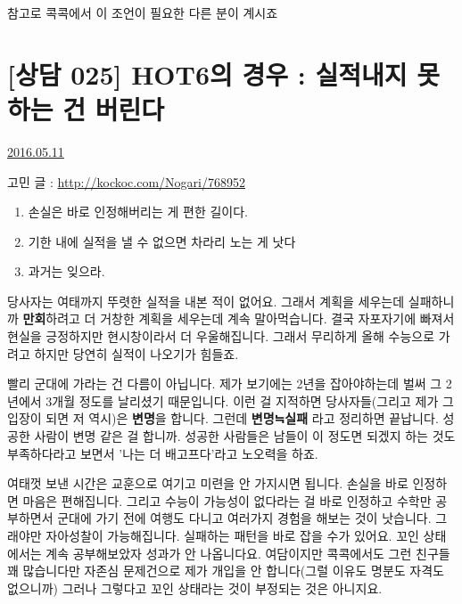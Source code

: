참고로 콕콕에서 이 조언이 필요한 다른 분이 계시죠
\vspace{5mm}






\section{[상담 025] HOT6의 경우 : 실적내지 못 하는 건 버린다}
\href{https://www.kockoc.com/Apoc/768967}{2016.05.11}

\vspace{5mm}

고민 글 : \url{http://kockoc.com/Nogari/768952}
\vspace{5mm}
\begin{enumerate}
    \item 손실은 바로 인정해버리는 게 편한 길이다.
    \item 기한 내에 실적을 낼 수 없으면 차라리 노는 게 낫다
    \item 과거는 잊으라.
\end{enumerate}
\vspace{5mm}

당사자는 여태까지 뚜렷한 실적을 내본 적이 없어요.
그래서 계획을 세우는데 실패하니까 \textbf{만회}하려고 더 거창한 계획을 세우는데 계속 말아먹습니다.
결국 자포자기에 빠져서 현실을 긍정하지만 현시창이라서 더 우울해집니다.
그래서 무리하게 올해 수능으로 가려고 하지만 당연히 실적이 나오기가 힘들죠.
\vspace{5mm}

빨리 군대에 가라는 건 다름이 아닙니다. 제가 보기에는 2년을 잡아야하는데 벌써 그 2년에서 3개월 정도를 날리셨기 때문입니다.
이런 걸 지적하면 당사자들(그리고 제가 그 입장이 되면 저 역시)은 \textbf{변명}을 합니다.
그런데 \textbf{변명≒실패} 라고 정리하면 끝납니다. 성공한 사람이 변명 같은 걸 합니까.
성공한 사람들은 남들이 이 정도면 되겠지 하는 것도 부족하다라고 보면서 '나는 더 배고프다'라고 노오력을 하죠.
\vspace{5mm}

여태껏 보낸 시간은 교훈으로 여기고 미련을 안 가지시면 됩니다. 손실을 바로 인정하면 마음은 편해집니다.
그리고 수능이 가능성이 없다라는 걸 바로 인정하고 수학만 공부하면서 군대에 가기 전에 여행도 다니고 여러가지 경험을 해보는 것이 낫습니다.
그래야만 자아성찰이 가능해집니다. 실패하는 패턴을 바로 잡을 수가 있어요.
꼬인 상태에서는 계속 공부해보았자 성과가 안 나옵니다요.
여담이지만 콕콕에서도 그런 친구들 꽤 많습니다만 자존심 문제건으로 제가 개입을 안 합니다(그럴 이유도 명분도 자격도 없으니까)
그러나 그렇다고 꼬인 상태라는 것이 부정되는 것은 아니지요.
\vspace{5mm}

